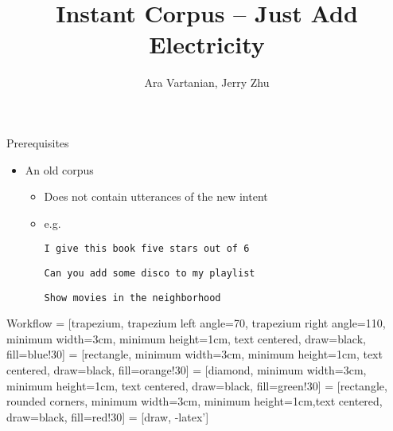 \documentclass[12pt]{beamer}
\title{Instant Corpus -- Just Add Electricity}
\author[Author]{Ara Vartanian, Jerry Zhu}
\institute{Department of Computer Sciences, University of Wisconsin-Madison}
\begin{document}

\begin{frame}
  \titlepage
\end{frame}

\begin{frame}{Prerequisites}
  \begin{itemize}
    \item An old corpus 
      \begin{itemize}
        \item Does not contain utterances of the new intent
        \item e.g.

          \texttt{I give this book five stars out of 6}

          \texttt{Can you add some disco to my playlist}

          \texttt{Show movies in the neighborhood}
        \end{itemize} 

  \end{itemize}
\end{frame}

  \begin{frame}{Workflow}
     = [trapezium, trapezium left angle=70, trapezium right angle=110, minimum width=3cm, minimum height=1cm, text centered, draw=black, fill=blue!30]
     = [rectangle, minimum width=3cm, minimum height=1cm, text centered, draw=black, fill=orange!30]
     = [diamond, minimum width=3cm, minimum height=1cm, text centered, draw=black, fill=green!30]
     = [rectangle, rounded corners, minimum width=3cm, minimum height=1cm,text centered, draw=black, fill=red!30]
     = [draw, -latex']

\centering
  \end{frame}
  
\end{document}
